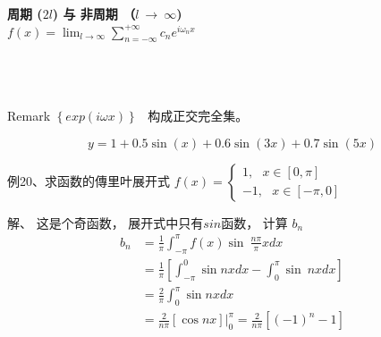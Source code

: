\begin{frame}
	\textbf{\large 周期 ($2l$) 与 非周期 （$l~\to ~\infty $) } \\
	{\large  $\displaystyle f(x) =\lim_{l\to \infty} \sum_{n=-\infty}^{+\infty}  c_n e^{i\omega_n x} $ }\\	
	\\	
	\\
	\\
	\begin{block} {Remark}
	$\left\{  exp(i\omega x)  \right\}$  构成正交完全集。\\
	\end{block}
\end{frame}

\begin{frame}
	\begin{equation*}
		y=1 + 0.5\sin(x)+0.6\sin(3x)+0.7\sin(5x)
	\end{equation*}    
\end{frame}

\begin{frame}
	\begin{exampleblock} {例20、求函数的傳里叶展开式}
	$\displaystyle f(x)=\begin{cases}
		1 , ~~~ x \in [0, \pi] \\
		-1 ,~~~ x \in [-\pi, 0] \
	\end{cases}$ \\
	\end{exampleblock}
	\alert{解、} 这是个奇函数， 展开式中只有$sin$函数， 计算 $b_n$\\
	\begin{align*}
		b_n &=\frac{1}{\pi}  \int_{-\pi}^{\pi}  f(x) \sin~ \frac{n\pi}{\pi} x dx  \\	
		&=\frac{1}{\pi}  [ \int_{-\pi}^{0}  \sin n x dx - \int_{0}^{\pi}  \sin~nx dx] \\
		&=\frac{2}{\pi}  \int_{0}^{\pi}  \sin nx dx  \\
		&=\frac{2}{n\pi} [\cos nx] |_0 ^\pi =\frac{2}{n\pi} [ (-1) ^n -1]
	\end{align*}
\end{frame}

